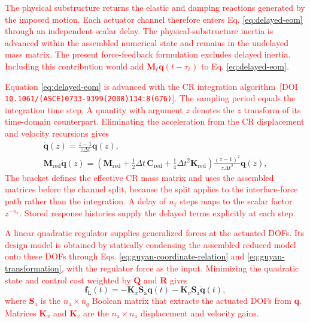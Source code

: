 \documentclass[11pt,a4paper]{article}
\numberwithin{equation}{section}
\newcommand{\rev}[1]{\textcolor{red}{#1}}
\begin{document}
\rev{The physical substructure returns the elastic and damping reactions generated by the imposed motion. Each actuator channel therefore enters Eq. \eqref{eq:delayed-eom} through an independent scalar delay. The physical-substructure inertia is advanced within the assembled numerical state and remains in the undelayed mass matrix. The present force-feedback formulation excludes delayed inertia. Including this contribution would add \(\mathbf{M}_{\ell}\ddot{\bm{q}}(t-\tau_{\ell})\) to Eq. \eqref{eq:delayed-eom}.}

\rev{Equation \eqref{eq:delayed-eom} is advanced with the CR integration algorithm} \cite{ChenRicles2008b}\,\rev{[DOI \nolinkurl{10.1061/(ASCE)0733-9399(2008)134:8(676)}]}. \rev{The sampling period equals the integration time step. A quantity with argument \(z\) denotes the \(z\) transform of its time-domain counterpart. Eliminating the acceleration from the CR displacement and velocity recursions gives}
\begin{equation}
	\begin{gathered}
		\dot{\bm{q}}(z)=\frac{z-1}{z\Delta t}\bm{q}(z),\\
		\mathbf{M}_{\mathrm{red}}\ddot{\bm{q}}(z)=
		\left(\mathbf{M}_{\mathrm{red}}
		+\tfrac{1}{2}\Delta t\,\mathbf{C}_{\mathrm{red}}
		+\tfrac{1}{4}\Delta t^{2}\mathbf{K}_{\mathrm{red}}\right)
		\frac{(z-1)^{2}}{z\Delta t^{2}}\bm{q}(z),
	\end{gathered}
	\label{eq:z-derivatives}
\end{equation}
\rev{The bracket defines the effective CR mass matrix and uses the assembled matrices before the channel split, because the split applies to the interface-force path rather than the integration. A delay of \(n_{\ell}\) steps maps to the scalar factor \(z^{-n_{\ell}}\). Stored response histories supply the delayed terms explicitly at each step.}

\rev{A linear quadratic regulator supplies generalized forces at the actuated DOFs. Its design model is obtained by statically condensing the assembled reduced model onto these DOFs through Eqs. \eqref{eq:guyan-coordinate-relation} and \eqref{eq:guyan-transformation}, with the regulator force as the input. Minimizing the quadratic state and control cost weighted by \(\mathbf{Q}\) and \(\mathbf{R}\) gives}
\begin{equation}
	\bm{f}_{\mathrm{L}}(t)=
	-\mathbf{K}_{x}\mathbf{S}_{\mathrm{a}}\bm{q}(t)
	-\mathbf{K}_{v}\mathbf{S}_{\mathrm{a}}\dot{\bm{q}}(t),
	\label{eq:lqr-law}
\end{equation}
\rev{where \(\mathbf{S}_{\mathrm{a}}\) is the \(n_{\mathrm{a}}\times n_{q}\) Boolean matrix that extracts the actuated DOFs from \(\bm{q}\). Matrices \(\mathbf{K}_{x}\) and \(\mathbf{K}_{v}\) are the \(n_{\mathrm{a}}\times n_{\mathrm{a}}\) displacement and velocity gains.}
\end{document}
